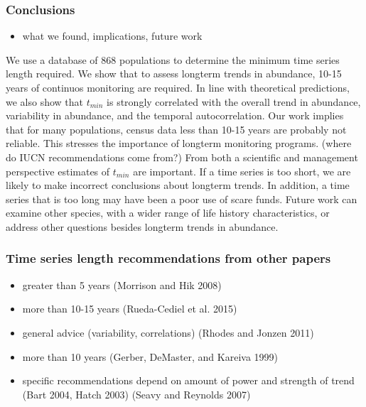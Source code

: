 \documentclass[11pt,]{article}
\providecommand{\tightlist}{%
  \setlength{\itemsep}{0pt}\setlength{\parskip}{0pt}}
\begin{document}
\subsubsection{Conclusions}\label{conclusions}

\begin{itemize}
\tightlist
\item
  what we found, implications, future work
\end{itemize}

We use a database of 868 populations to determine the minimum time
series length required. We show that to assess longterm trends in
abundance, 10-15 years of continuos monitoring are required. In line
with theoretical predictions, we also show that \(t_{min}\) is strongly
correlated with the overall trend in abundance, variability in
abundance, and the temporal autocorrelation. Our work implies that for
many populations, census data less than 10-15 years are probably not
reliable. This stresses the importance of longterm monitoring programs.
(where do IUCN recommendations come from?) From both a scientific and
management perspective estimates of \(t_{min}\) are important. If a time
series is too short, we are likely to make incorrect conclusions about
longterm trends. In addition, a time series that is too long may have
been a poor use of scare funds. Future work can examine other species,
with a wider range of life history characteristics, or address other
questions besides longterm trends in abundance.

\subsubsection{Time series length recommendations from other
papers}\label{time-series-length-recommendations-from-other-papers}

\begin{itemize}
\tightlist
\item
  greater than 5 years (Morrison and Hik 2008)
\item
  more than 10-15 years (Rueda-Cediel et al. 2015)
\item
  general advice (variability, correlations) (Rhodes and Jonzen 2011)
\item
  more than 10 years (Gerber, DeMaster, and Kareiva 1999)
\item
  specific recommendations depend on amount of power and strength of
  trend (Bart 2004, Hatch 2003) (Seavy and Reynolds 2007)
\end{itemize}
\end{document}
